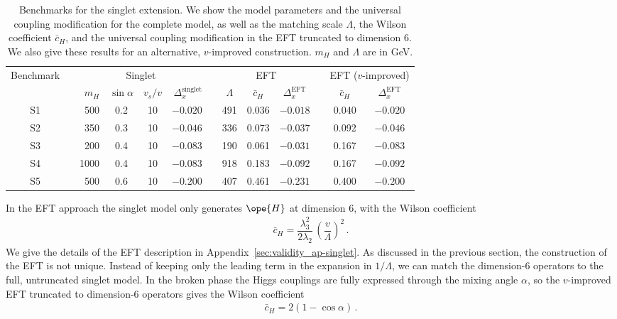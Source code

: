 \begin{table}[t] \renewcommand{\arraystretch}{1.2} \centering
    \begin{tabular}{c c rccr c ccc c cc} \toprule
\multirow{2}{*}{Benchmark} &\hspace*{1em}& \multicolumn{4}{c}{Singlet}
&\hspace*{1em}& \multicolumn{3}{c}{EFT} &\hspace*{1em}&
\multicolumn{2}{c}{EFT ($v$-improved)} \\ \cmidrule{3-6}
\cmidrule{8-10} \cmidrule{12-13} && $m_H$ & $\sin\alpha$ & $v_s/v$ &
$\Delta_x^\text{singlet}$ && $\Lambda$ & $\bar{c}_H$ &
$\Delta_x^\text{EFT}$ && $\bar{c}_H$ & $\Delta_x^\text{EFT}$\\
\midrule S1 && 500 & 0.2 & 10 & $-0.020$ && 491 & 0.036 & $-0.018$ &&
0.040 & $-0.020$ \\ S2 && 350 & 0.3 & 10 & $-0.046$ && 336 & 0.073 &
$-0.037$ && 0.092 & $-0.046$ \\ S3 && 200 & 0.4 & 10 & $-0.083$ && 190
& 0.061 & $-0.031$ && 0.167 & $-0.083$ \\ S4 && 1000 & 0.4 & 10 &
$-0.083$ && 918 & 0.183 & $-0.092$ && 0.167 & $-0.092$ \\ S5 && 500 &
0.6 & 10 & $-0.200$ && 407 & 0.461 & $-0.231$ && 0.400 & $-0.200$ \\
\bottomrule
    \end{tabular}
  \caption{Benchmarks for the singlet extension. We show the model
parameters and the universal coupling modification for the complete
model, as well as the matching scale $\Lambda$, the Wilson coefficient
$\bar{c}_H$, and the universal coupling modification in the EFT
truncated to dimension 6. We also give these results for an
alternative, $v$-improved construction. $m_H$ and $\Lambda$ are in
GeV.}
  \label{tab:singlet_benchmarks}
\end{table}

In the EFT approach the singlet model only generates $\ope{H}$ at
dimension 6, with the Wilson coefficient
%
\begin{align} \bar{c}_H = \dfrac{\lambda_3^2}{2\lambda_2} \,
\left(\dfrac {v} {\Lambda}\right)^2 \,.
\end{align}
%
We give the details of the EFT description in
Appendix~\ref{sec:validity_ap-singlet}.  As discussed in the previous section,
the construction of the EFT is not unique.  Instead of keeping only
the leading term in the expansion in $1/\Lambda$, we can match the
dimension-6 operators to the full, untruncated singlet model.  In the
broken phase the Higgs couplings are fully expressed through the
mixing angle $\alpha$, so the $v$-improved EFT truncated to
dimension-6 operators gives the Wilson coefficient
%
\begin{align} \bar{c}_H = 2 ( 1-\cos \alpha)\,.
\end{align} \medskip

